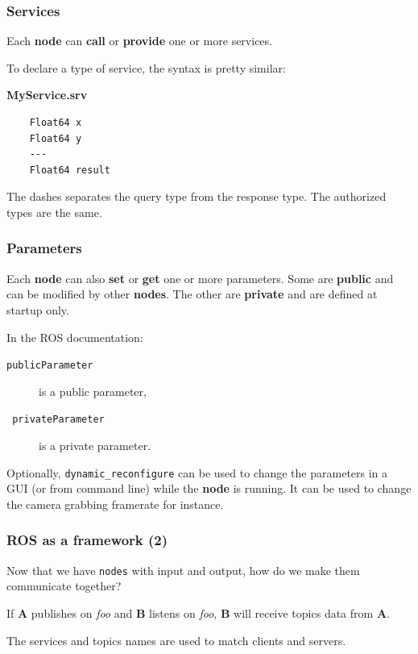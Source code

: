 \documentclass[hyperref={pdfpagelabels=false}]{beamer}
\begin{document}
\begin{frame}[fragile]
  \frametitle{Services}

  Each \textbf{node} can \textbf{call} or \textbf{provide} one or more
  services.

  To declare a type of service, the syntax is pretty similar:

  \textbf{MyService.srv}
  \begin{verbatim}
    Float64 x
    Float64 y
    ---
    Float64 result
  \end{verbatim}

  The dashes separates the query type from the response type. The
  authorized types are the same.
\end{frame}


\begin{frame}[fragile]
  \frametitle{Parameters}

  Each \textbf{node} can also \textbf{set} or \textbf{get} one or more
  parameters. Some are \textbf{public} and can be modified by other
  \textbf{nodes}. The other are \textbf{private} and are defined at
  startup only.

  \vspace{0.3cm}

  In the ROS documentation:
  \begin{description}
  \item[\texttt{publicParameter}] is a public parameter,
  \item[\texttt{~privateParameter}] is a private parameter.
  \end{description}

  \vspace{0.3cm}

  Optionally, \texttt{dynamic\_reconfigure} can be used to change the
  parameters in a GUI (or from command line) while the \textbf{node}
  is running. It can be used to change the camera grabbing framerate
  for instance.
\end{frame}

\begin{frame}
  \frametitle{ROS as a framework (2)}

  Now that we have \texttt{nodes} with input and output, how do we
  make them communicate together?

  \vspace{0.3cm}

  If \textbf{A} publishes on \textit{foo} and \textbf{B} listens on
  \textit{foo}, \textbf{B} will receive topics data from \textbf{A}.

  \vspace{0.3cm}

  The services and topics names are used to match clients and servers.
\end{frame}
\end{document}
